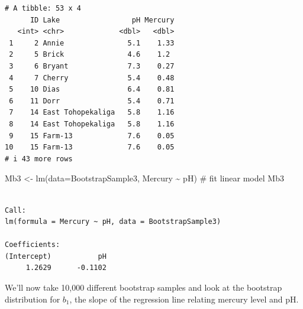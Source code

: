 \documentclass[
  letterpaper,
  DIV=11,
  numbers=noendperiod]{scrreprt}
\newenvironment{Shaded}{\begin{snugshade}}{\end{snugshade}}
\newcommand{\AttributeTok}[1]{\textcolor[rgb]{0.40,0.45,0.13}{#1}}
\newcommand{\CommentTok}[1]{\textcolor[rgb]{0.37,0.37,0.37}{#1}}
\newcommand{\FunctionTok}[1]{\textcolor[rgb]{0.28,0.35,0.67}{#1}}
\newcommand{\NormalTok}[1]{\textcolor[rgb]{0.00,0.23,0.31}{#1}}
\newcommand{\OtherTok}[1]{\textcolor[rgb]{0.00,0.23,0.31}{#1}}
\newcommand{\SpecialCharTok}[1]{\textcolor[rgb]{0.37,0.37,0.37}{#1}}
\begin{document}
\begin{verbatim}
# A tibble: 53 x 4
      ID Lake                 pH Mercury
   <int> <chr>             <dbl>   <dbl>
 1     2 Annie               5.1    1.33
 2     5 Brick               4.6    1.2 
 3     6 Bryant              7.3    0.27
 4     7 Cherry              5.4    0.48
 5    10 Dias                6.4    0.81
 6    11 Dorr                5.4    0.71
 7    14 East Tohopekaliga   5.8    1.16
 8    14 East Tohopekaliga   5.8    1.16
 9    15 Farm-13             7.6    0.05
10    15 Farm-13             7.6    0.05
# i 43 more rows
\end{verbatim}

\begin{Shaded}
\begin{Highlighting}[]
\NormalTok{Mb3 }\OtherTok{\textless{}{-}} \FunctionTok{lm}\NormalTok{(}\AttributeTok{data=}\NormalTok{BootstrapSample3, Mercury }\SpecialCharTok{\textasciitilde{}}\NormalTok{ pH) }\CommentTok{\# fit linear model}
\NormalTok{Mb3}
\end{Highlighting}
\end{Shaded}

\begin{verbatim}

Call:
lm(formula = Mercury ~ pH, data = BootstrapSample3)

Coefficients:
(Intercept)           pH  
     1.2629      -0.1102  
\end{verbatim}

We'll now take 10,000 different bootstrap samples and look at the
bootstrap distribution for \(b_1\), the slope of the regression line
relating mercury level and pH.
\end{document}
